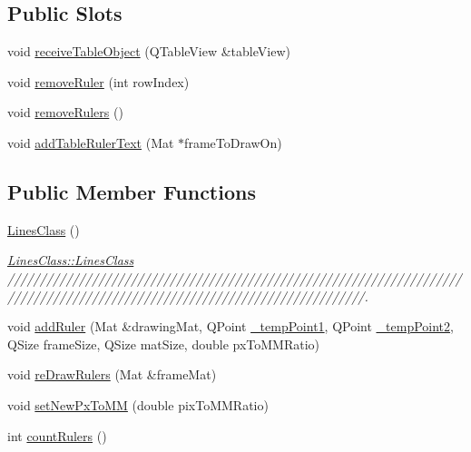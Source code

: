 \subsection*{Public Slots}
\begin{DoxyCompactItemize}
\item 
void \mbox{\hyperlink{classLinesClass_a7cbdbb9847cc00cbc64141572c536866}{receive\+Table\+Object}} (Q\+Table\+View \&table\+View)
\item 
void \mbox{\hyperlink{classLinesClass_a714be78a9c85c6ba3c8456e8ee1a5290}{remove\+Ruler}} (int row\+Index)
\item 
void \mbox{\hyperlink{classLinesClass_a6214ae9c3e61143c6ee013e55d346281}{remove\+Rulers}} ()
\item 
void \mbox{\hyperlink{classLinesClass_a40228921775f778a33a391bad2830d1c}{add\+Table\+Ruler\+Text}} (Mat $\ast$frame\+To\+Draw\+On)
\end{DoxyCompactItemize}
\subsection*{Public Member Functions}
\begin{DoxyCompactItemize}
\item 
\mbox{\hyperlink{classLinesClass_a27cc25678359a1897ad8b29390e612cc}{Lines\+Class}} ()
\begin{DoxyCompactList}\small\item\em \mbox{\hyperlink{classLinesClass_a27cc25678359a1897ad8b29390e612cc}{Lines\+Class\+::\+Lines\+Class}} /////////////////////////////////////////////////////////////////////////////////////////////////////////////////////////////. \end{DoxyCompactList}\item 
void \mbox{\hyperlink{classLinesClass_ab61cc7912d5903aec574d53847e7ebf2}{add\+Ruler}} (Mat \&drawing\+Mat, Q\+Point \mbox{\hyperlink{classLinesClass_ae6dfe8a03b4d94cc17486f4020b6ad5e}{\+\_\+temp\+Point1}}, Q\+Point \mbox{\hyperlink{classLinesClass_a6c65dce259446985fdd0c97525e55642}{\+\_\+temp\+Point2}}, Q\+Size frame\+Size, Q\+Size mat\+Size, double px\+To\+M\+M\+Ratio)
\item 
void \mbox{\hyperlink{classLinesClass_a7fad9c7b48f6d55017423ffa9897b071}{re\+Draw\+Rulers}} (Mat \&frame\+Mat)
\item 
void \mbox{\hyperlink{classLinesClass_a27046d1871f85101660c20703d87b1db}{set\+New\+Px\+To\+MM}} (double pix\+To\+M\+M\+Ratio)
\item 
int \mbox{\hyperlink{classLinesClass_a1b656266d53d9364c9969514efd2c878}{count\+Rulers}} ()
\end{DoxyCompactItemize}
